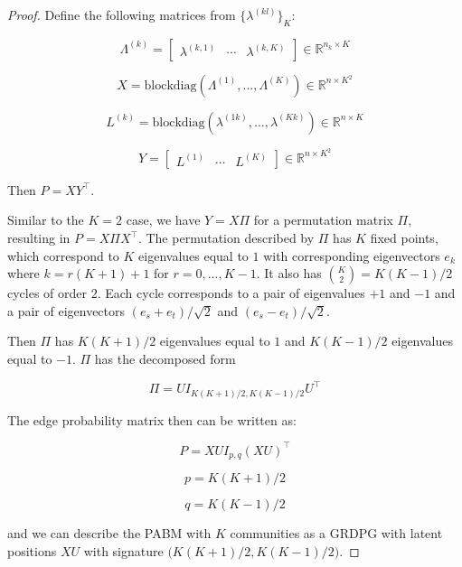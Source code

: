 \documentclass[
  11pt,
]{article}
\begin{document}
\begin{proof}
Define the following matrices from $\{\lambda^{(kl)}\}_K$: 

$$\Lambda^{(k)} = 
\begin{bmatrix} \lambda^{(k,1)} & \cdots & \lambda^{(k, K)} \end{bmatrix}
\in \mathbb{R}^{n_k \times K}$$

\begin{equation} \label{eq:xy}
X = \text{blockdiag}(\Lambda^{(1)}, ..., \Lambda^{(K)}) \in \mathbb{R}^{n \times K^2}
\end{equation}

$$L^{(k)} = \text{blockdiag}(\lambda^{(1k)}, ..., \lambda^{(Kk)}) \in 
\mathbb{R}^{n \times K}$$

$$Y = \begin{bmatrix} L^{(1)} & \cdots & L^{(K)} \end{bmatrix} \in 
\mathbb{R}^{n \times K^2}$$

Then $P = X Y^\top$.

Similar to the $K = 2$ case, we have $Y = X \Pi$ for a permutation matrix
$\Pi$, resulting in $P = X \Pi X^\top$.  
The permutation described by $\Pi$ has $K$ fixed points, which correspond to 
$K$ eigenvalues equal to $1$ with corresponding eigenvectors $e_k$ where 
$k = r (K + 1) + 1$ for $r = 0, ..., K - 1$. It also has 
$\binom{K}{2} = K (K - 1) / 2$ cycles of order $2$. Each cycle corresponds to 
a pair of eigenvalues $+1$ and $-1$ and a pair of eigenvectors 
$(e_s + e_t) / \sqrt{2}$ and $(e_s - e_t) / \sqrt{2}$.

Then $\Pi$ has $K (K + 1) / 2$ eigenvalues equal to $1$ and $K (K - 1) / 2$ 
eigenvalues equal to $-1$. $\Pi$ has the decomposed form 

\begin{equation} \label{eq:permutation}
\Pi = U I_{K (K + 1) / 2, K (K - 1) / 2} U^\top
\end{equation}

The edge probability matrix then can be written as:

\begin{equation} \label{eq:pabm-grdpg}
P = X U I_{p, q} (X U)^\top
\end{equation}

\begin{equation} \label{eq:p}
p = K (K + 1) / 2
\end{equation}

\begin{equation} \label{eq:q}
q = K (K - 1) / 2
\end{equation}

and we can describe the PABM with $K$ communities as a GRDPG with latent 
positions $X U$ with signature $\big( K (K + 1) / 2, K (K - 1) / 2 \big)$.
\end{proof}
\end{document}
